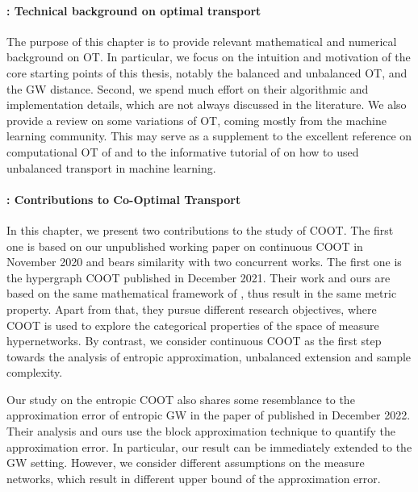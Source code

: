 \paragraph{ : Technical background on optimal transport}

The purpose of this chapter is to provide relevant mathematical and numerical background
on OT. In particular, we focus on the intuition and motivation of the core starting points
of this thesis, notably the balanced and unbalanced OT, and the GW distance.
Second, we spend much effort on their algorithmic and implementation details, which are not
always discussed in the literature. We also provide a review on some variations of OT,
coming mostly from the machine learning community. This may serve as a supplement
to the excellent reference on computational OT of \citet{Peyre19} and to the informative
tutorial of \citet{Sejourne22} on how to used unbalanced transport in machine learning.

\paragraph{: Contributions to Co-Optimal Transport}

In this chapter, we present two contributions to the study of COOT.
The first one is based on our unpublished working paper
on continuous COOT in November 2020 and bears similarity with two concurrent works.
The first one is the hypergraph COOT \citep{Chowdhury21b} published in December 2021.
Their work and ours are based on the same mathematical framework of \citet{Chowdhury19},
thus result in the same metric property. Apart from that, they pursue different research objectives,
where COOT is used to explore the categorical properties of the space of measure hypernetworks.
By contrast, we consider continuous COOT as the first step towards the analysis of
entropic approximation, unbalanced extension and sample complexity.

Our study on the entropic COOT also shares some resemblance to the approximation error of
entropic GW in the paper of \citet{Zhang23} published in December 2022.
Their analysis and ours use the block approximation technique \citep{Carlier17}
to quantify the approximation error.
In particular, our result can be immediately extended to the GW setting. However,
we consider different assumptions on the measure networks,
which result in different upper bound of the approximation error.

